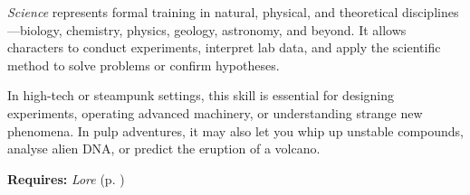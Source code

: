 \emph{Science} represents formal training in natural, physical, and theoretical disciplines—biology, chemistry, physics, geology, astronomy, and beyond. It allows characters to conduct experiments, interpret lab data, and apply the scientific method to solve problems or confirm hypotheses.

In high-tech or steampunk settings, this skill is essential for designing experiments, operating advanced machinery, or understanding strange new phenomena. In pulp adventures, it may also let you whip up unstable compounds, analyse alien DNA, or predict the eruption of a volcano.

\vspace{0.5\baselineskip}
\noindent\textbf{Requires:} \emph{Lore} (p. \pageref{skill:lore})

